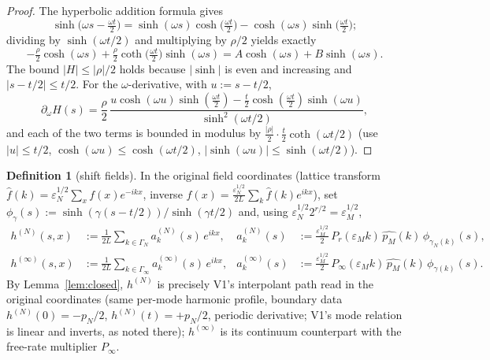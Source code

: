 \documentclass[11pt,a4paper]{article}
\theoremstyle{plain}
\theoremstyle{definition}
\newtheorem{definition}[theorem]{Definition}
\newcommand{\eps}{\varepsilon}
\DeclareMathOperator{\cth}{coth}
\DeclareMathOperator{\sh}{sinh}
\newcommand{\ch}{\cosh}
\begin{document}
\begin{proof}
The hyperbolic addition formula gives
\[
 \sh\bigl(\omega s-\tfrac{\omega t}2\bigr)
 =\sh(\omega s)\ch\bigl(\tfrac{\omega t}2\bigr)
 -\ch(\omega s)\sh\bigl(\tfrac{\omega t}2\bigr);
\]
dividing by $\sh(\omega t/2)$ and multiplying by $\rho/2$ yields exactly
\[
 -\tfrac\rho2\ch(\omega s)
 +\tfrac\rho2\cth\bigl(\tfrac{\omega t}2\bigr)\sh(\omega s)
 =A\ch(\omega s)+B\sh(\omega s).
\] The bound $|H|\le|\rho|/2$ holds because $|\sh|$ is even and
increasing and $|s-t/2|\le t/2$. For the $\omega$-derivative, with
$u:=s-t/2$,
\[
 \partial_\omega H(s)=\frac\rho2\,
 \frac{u\ch(\omega u)\sh(\tfrac{\omega t}2)
 -\tfrac t2\ch(\tfrac{\omega t}2)\sh(\omega u)}{\sh^2(\omega t/2)},
\]
and each of the two terms is bounded in modulus by
$\tfrac{|\rho|}2\cdot\tfrac t2\cth(\omega t/2)$ (use $|u|\le t/2$,
$\ch(\omega u)\le\ch(\omega t/2)$, $|\sh(\omega u)|\le\sh(\omega t/2)$).
\end{proof}

\begin{definition}[shift fields]\label{def:shift}
In the original field coordinates (lattice transform
$\widehat f(k)=\eps_N^{1/2}\sum_xf(x)e^{-ikx}$, inverse
$f(x)=\tfrac{\eps_N^{1/2}}{2L}\sum_k\widehat f(k)e^{ikx}$), set
$\phi_\gamma(s):=\sh(\gamma(s-t/2))/\sh(\gamma t/2)$ and, using
$\eps_N^{1/2}2^{r/2}=\eps_M^{1/2}$,
\begin{align*}
 h^{(N)}(s,x)&:=\frac1{2L}\sum_{k\in\Gamma_N}a^{(N)}_k(s)\,e^{ikx},&
 a^{(N)}_k(s)&:=\frac{\eps_M^{1/2}}2\,P_r(\eps_Mk)\,\widehat{p_M}(k)\,
 \phi_{\gamma_N(k)}(s),\\
 h^{(\infty)}(s,x)&:=\frac1{2L}\sum_{k\in\Gamma_\infty}a^{(\infty)}_k(s)
 \,e^{ikx},&
 a^{(\infty)}_k(s)&:=\frac{\eps_M^{1/2}}2\,P_\infty(\eps_Mk)\,
 \widehat{p_M}(k)\,\phi_{\gamma(k)}(s).
\end{align*}
By Lemma~\ref{lem:closed}, $h^{(N)}$ is precisely V1's interpolant path read
in the original coordinates (same per-mode harmonic profile, boundary data
$h^{(N)}(0)=-p_N/2$, $h^{(N)}(t)=+p_N/2$, periodic derivative; V1's mode
relation is linear and inverts, as noted there); $h^{(\infty)}$ is its
continuum counterpart with the free-rate multiplier $P_\infty$.
\end{definition}
\end{document}
